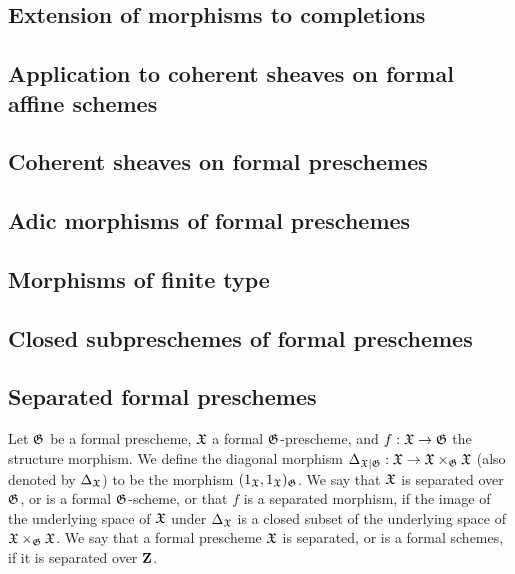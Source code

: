 \subsection{Extension of morphisms to completions}
\label{subsection-extension-of-morphisms-to-completions}

\subsection{Application to coherent sheaves on formal affine schemes}
\label{subsection-application-to-coherent-sheaves-on-formal-affine-schemes}

\subsection{Coherent sheaves on formal preschemes}
\label{subsection-coherent-sheaves-on-formal-preschemes}

\subsection{Adic morphisms of formal preschemes}
\label{subsection-adic-morphisms-of-formal-preschemes}

\begin{env}[10.12.1]
\label{1.10.12.1}
\end{env}

\subsection{Morphisms of finite type}
\label{subsection-morphisms-of-finite-type}

\subsection{Closed subpreschemes of formal preschemes}
\label{subsection-closed-subpreschemes-of-formal-preschemes}

\subsection{Separated formal preschemes}
\label{subsection-separated-formal-preschemes}

\begin{defn}[10.15.1]
\label{1.10.15.1}
Let $\mathfrak{G}$ be a formal prescheme, $\mathfrak{X}$ a formal $\mathfrak{G}$-prescheme, and $f:\fk{X}\to\fk{G}$ the structure morphism.
We define the diagonal morphism $\Delta_{\fk{X}|\fk{G}}:\fk{X}\to\fk{X}\times_\fk{G}\fk{X}$ (also denoted by $\Delta_\mathfrak{X}$) to be the morphism $(1_\mathfrak{X},1_\mathfrak{X})_\mathfrak{G}$.
We say that $\mathfrak{X}$ is separated over $\mathfrak{G}$, or is a formal $\mathfrak{G}$-scheme, or that $f$ is a separated morphism, if the image of the underlying space of $\mathfrak{X}$ under $\Delta_\mathfrak{X}$ is a closed subset of the underlying space of $\mathfrak{X}\times_\mathfrak{G}\mathfrak{X}$.
We say that a formal prescheme $\mathfrak{X}$ is separated, or is a formal schemes, if it is separated over $\mathbf{Z}$.
\end{defn}

